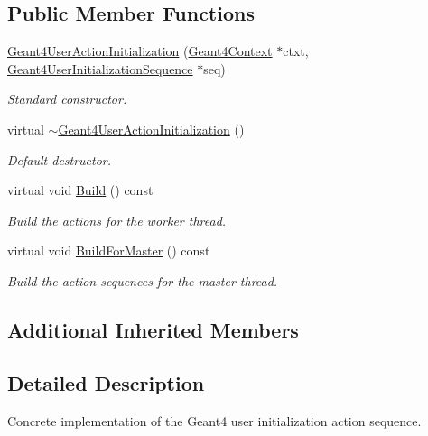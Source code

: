 \subsection*{Public Member Functions}
\begin{DoxyCompactItemize}
\item 
\hyperlink{class_d_d4hep_1_1_simulation_1_1_geant4_user_action_initialization_ad5dad70e283015614959f397022c506a}{Geant4\+User\+Action\+Initialization} (\hyperlink{class_d_d4hep_1_1_simulation_1_1_geant4_context}{Geant4\+Context} $\ast$ctxt, \hyperlink{class_d_d4hep_1_1_simulation_1_1_geant4_user_initialization_sequence}{Geant4\+User\+Initialization\+Sequence} $\ast$seq)
\begin{DoxyCompactList}\small\item\em Standard constructor. \end{DoxyCompactList}\item 
virtual \hyperlink{class_d_d4hep_1_1_simulation_1_1_geant4_user_action_initialization_a576b51911e71f7979dd327d8a76b1738}{$\sim$\+Geant4\+User\+Action\+Initialization} ()
\begin{DoxyCompactList}\small\item\em Default destructor. \end{DoxyCompactList}\item 
virtual void \hyperlink{class_d_d4hep_1_1_simulation_1_1_geant4_user_action_initialization_a40c0a5ec6b6620b04fd2f350c6b2d64d}{Build} () const
\begin{DoxyCompactList}\small\item\em Build the actions for the worker thread. \end{DoxyCompactList}\item 
virtual void \hyperlink{class_d_d4hep_1_1_simulation_1_1_geant4_user_action_initialization_a3753e3e5ae78b1a9de8940d4f8057e4a}{Build\+For\+Master} () const
\begin{DoxyCompactList}\small\item\em Build the action sequences for the master thread. \end{DoxyCompactList}\end{DoxyCompactItemize}
\subsection*{Additional Inherited Members}


\subsection{Detailed Description}
Concrete implementation of the Geant4 user initialization action sequence. 

